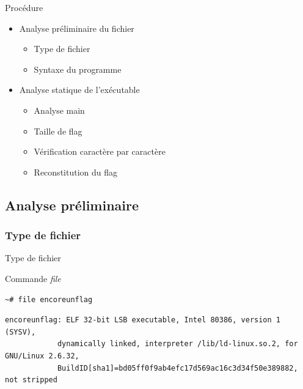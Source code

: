 \documentclass[10pt,sans,usenames,dvipsnames,french,compress]{beamer}
\begin{document}
\begin{frame}{Procédure}
	\begin{itemize}
		\item Analyse préliminaire du fichier

		\begin{itemize}
			\item Type de fichier
			\item Syntaxe du programme
		\end{itemize}

		\item Analyse statique de l'exécutable

		\begin{itemize}
			\item Analyse main
			\item Taille de flag
			\item Vérification caractère par caractère
			\item Reconstitution du flag
		\end{itemize}
	\end{itemize}
\end{frame}

\subsection{Analyse préliminaire}
\subsubsection{Type de fichier}
\begin{frame}[fragile]{Type de fichier}
	\begin{block}{Commande \textit{file}}
		\vspace{-3mm}
		\begin{lstlisting}[style=Term]
			~# file encoreunflag
		\end{lstlisting}
		\vspace{-2mm}
	\end{block}

	\begin{block}{}
		\vspace{-3mm}
		\begin{lstlisting}[style=Term]
			encoreunflag: ELF 32-bit LSB executable, Intel 80386, version 1 (SYSV),
			dynamically linked, interpreter /lib/ld-linux.so.2, for GNU/Linux 2.6.32,
			BuildID[sha1]=bd05ff0f9ab4efc17d569ac16c3d34f50e389882, not stripped
		\end{lstlisting}
		\vspace{-2mm}
	\end{block}
\end{frame}
\end{document}

